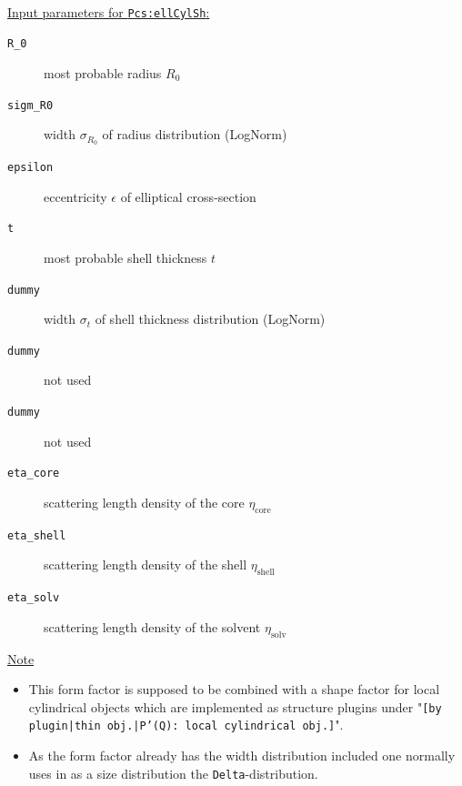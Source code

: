 \vspace{5mm}

\hspace{1pt}\\
\underline{Input parameters for \texttt{Pcs:ellCylSh}:}
\begin{description}
    \item[\texttt{R\_0}] most probable radius $R_0$
    \item[\texttt{sigm\_R0}] width $\sigma_{R_0}$ of radius distribution (LogNorm)
    \item[\texttt{epsilon}] eccentricity $\epsilon$ of elliptical cross-section
    \item[\texttt{t}] most probable shell thickness $t$
    \item[\texttt{dummy}] width $\sigma_t$ of shell thickness distribution (LogNorm)
    \item[\texttt{dummy}] not used
    \item[\texttt{dummy}] not used
    \item[\texttt{eta\_core}] scattering length density of the core $\eta_\textrm{core}$
    \item[\texttt{eta\_shell}] scattering length density of the shell $\eta_\textrm{shell}$
    \item[\texttt{eta\_solv}] scattering length density of the solvent $\eta_\textrm{solv}$
\end{description}

\noindent
\underline{Note}
\begin{itemize}
  \item This form factor is supposed to be combined with a shape factor for
local cylindrical objects which are implemented as structure  plugins
under "\texttt{[by plugin|thin obj.|P'(Q): local cylindrical obj.]}".
\item As the form factor already has the width distribution included one normally uses in \SASfit as a size distribution
the \texttt{Delta}-distribution.
\end{itemize}

